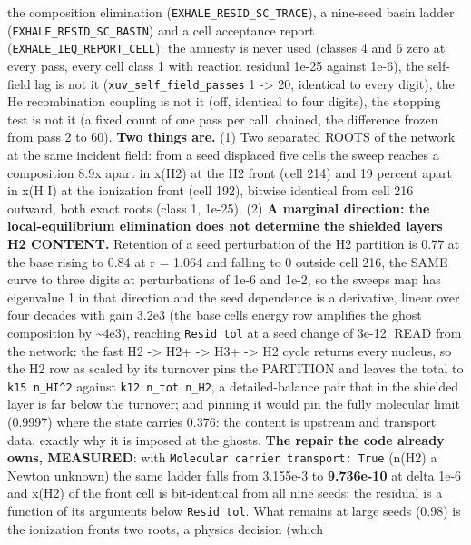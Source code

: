 \documentclass[english,a4paper]{my_memo}
\begin{document}
\begin{itemize}
  the composition elimination (\texttt{EXHALE\_RESID\_SC\_TRACE}), a nine-seed basin
  ladder (\texttt{EXHALE\_RESID\_SC\_BASIN}) and a cell acceptance report
  (\texttt{EXHALE\_IEQ\_REPORT\_CELL}): the amnesty is never used (classes 4 and 6
  zero at every pass, every cell class 1 with reaction residual 1e-25
  against 1e-6), the self-field lag is not it (\texttt{xuv\_self\_field\_passes} 1 -\textgreater{}
  20, identical to every digit), the He recombination coupling is not it
  (off, identical to four digits), the stopping test is not it (a fixed
  count of one pass per call, chained, the difference frozen from pass 2
  to 60). \textbf{Two things are.} (1) Two separated ROOTS of the network at the
  same incident field: from a seed displaced five cells the sweep reaches a
  composition 8.9x apart in x(H2) at the H2 front (cell 214) and 19 percent
  apart in x(H I) at the ionization front (cell 192), bitwise identical from
  cell 216 outward, both exact roots (class 1, 1e-25). (2) \textbf{A marginal
  direction: the local-equilibrium elimination does not determine the
  shielded layer\textquotesingle s H2 CONTENT.} Retention of a seed perturbation of the H2
  partition is 0.77 at the base rising to 0.84 at r = 1.064 and falling to
  0 outside cell 216, the SAME curve to three digits at perturbations of
  1e-6 and 1e-2, so the sweep\textquotesingle s map has eigenvalue 1 in that direction and
  the seed dependence is a derivative, linear over four decades with gain
  3.2e3 (the base cell\textquotesingle s energy row amplifies the ghost composition by
  \textasciitilde4e3), reaching \texttt{Resid\ tol} at a seed change of 3e-12. READ from the
  network: the fast H2 -\textgreater{} H2+ -\textgreater{} H3+ -\textgreater{} H2 cycle returns every nucleus, so
  the H2 row as scaled by its turnover pins the PARTITION and leaves the
  total to \texttt{k15\ n\_HI\^{}2} against \texttt{k12\ n\_tot\ n\_H2}, a detailed-balance pair
  that in the shielded layer is far below the turnover; and pinning it
  would pin the fully molecular limit (0.9997) where the state carries
  0.376: the content is upstream and transport data, exactly why it is
  imposed at the ghosts. \textbf{The repair the code already owns, MEASURED}:
  with \texttt{Molecular\ carrier\ transport:\ True} (n(H2) a Newton unknown) the
  same ladder falls from 3.155e-3 to \textbf{9.736e-10} at delta 1e-6 and x(H2)
  of the front cell is bit-identical from all nine seeds; the residual is a
  function of its arguments below \texttt{Resid\ tol}. What remains at large seeds
  (0.98) is the ionization front\textquotesingle s two roots, a physics decision (which

\end{itemize}
\end{document}
